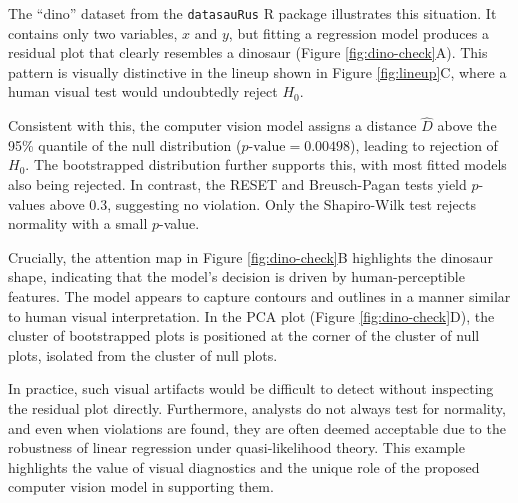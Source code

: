 \documentclass[]{interact}
\theoremstyle{plain}%
\theoremstyle{definition}
\theoremstyle{remark}
\begin{document}
The ``dino'' dataset from the \texttt{datasauRus} R package illustrates
this situation. It contains only two variables, \(x\) and \(y\), but
fitting a regression model produces a residual plot that clearly
resembles a dinosaur (Figure \ref{fig:dino-check}A). This pattern is
visually distinctive in the lineup shown in Figure \ref{fig:lineup}C,
where a human visual test would undoubtedly reject \(H_0\).

Consistent with this, the computer vision model assigns a distance
\(\hat{D}\) above the 95\% quantile of the null distribution
(\(p\text{-value} = 0.00498\)), leading to rejection of \(H_0\). The
bootstrapped distribution further supports this, with most fitted models
also being rejected. In contrast, the RESET and Breusch-Pagan tests
yield \(p\)-values above \(0.3\), suggesting no violation. Only the
Shapiro-Wilk test rejects normality with a small \(p\)-value.

Crucially, the attention map in Figure \ref{fig:dino-check}B highlights
the dinosaur shape, indicating that the model's decision is driven by
human-perceptible features. The model appears to capture contours and
outlines in a manner similar to human visual interpretation. In the PCA
plot (Figure \ref{fig:dino-check}D), the cluster of bootstrapped plots
is positioned at the corner of the cluster of null plots, isolated from
the cluster of null plots.

In practice, such visual artifacts would be difficult to detect without
inspecting the residual plot directly. Furthermore, analysts do not
always test for normality, and even when violations are found, they are
often deemed acceptable due to the robustness of linear regression under
quasi-likelihood theory. This example highlights the value of visual
diagnostics and the unique role of the proposed computer vision model in
supporting them.
\end{document}
